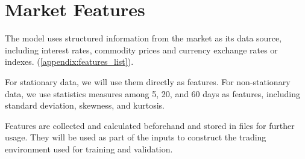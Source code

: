 \section{Market Features}
The model uses structured information from the market as its data source, including interest rates, commodity prices and currency exchange rates or indexes. (\autoref{appendix:features_list}).
\par
For stationary data, we will use them directly as features. For non-stationary data, we use statistics measures among 5, 20, and 60 days as features, including standard deviation, skewness, and kurtosis.
\par
Features are collected and calculated beforehand and stored in files for further usage. They will be used as part of the inputs to construct the trading environment used for training and validation.